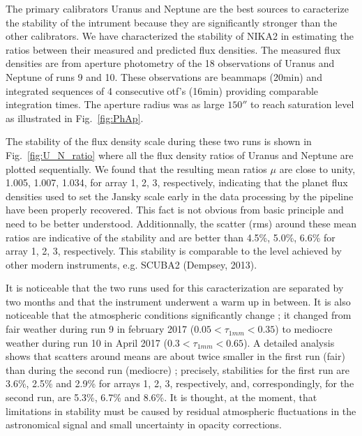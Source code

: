 The primary calibrators Uranus and Neptune are the best sources to caracterize the stability of the intrument
because they are significantly stronger than the other calibrators.
We have characterized the stability of NIKA2  in estimating the ratios between their measured 
and predicted flux densities. The measured flux densities are from aperture photometry of the
18 observations  of Uranus and Neptune of runs 9 and 10. These observations are   beammaps  (20min) and integrated sequences of 4 consecutive otf's 
(16min) providing comparable integration times. The aperture radius was as large $150''$ to reach saturation level
as illustrated in Fig.~\ref{fig:PhAp}. 

The stability of the flux density scale during these two runs 
is shown  in  Fig.~\ref{fig:U_N_ratio}  where all the flux density ratios of Uranus and Neptune are
plotted sequentially.
We found that the resulting mean ratios $\mu$ are close to unity,  1.005, 1.007, 1.034, for array 1, 2, 3, respectively,
indicating that the planet flux densities used to set the Jansky scale 
early in the data processing by the pipeline have been properly recovered. This fact is not obvious from basic principle and need to be better
understood. Additionnally, the scatter (rms) around these mean ratios are indicative of
the stability and are better than 4.5\%, 5.0\%, 6.6\% for array 1, 2, 3,
respectively. This stability is comparable to the level achieved by other modern instruments,
e.g. SCUBA2 (Dempsey, 2013).

It is noticeable that the two runs used for this caracterization  are
separated by two months and that the instrument underwent a warm up in between. It is also noticeable that the
atmospheric conditions significantly change ; it changed from fair weather during run 9 in february 2017
($0.05 < \tau_{1mm} < 0.35$) to mediocre weather during run 10 in April 2017 ($0.3 < \tau_{1mm} < 0.65$). 
A detailed analysis shows that scatters around means 
are about twice smaller in the first run (fair) than during the second run (mediocre) ;
precisely, stabilities for the first run
are 3.6\%, 2.5\% and 2.9\% for arrays 1, 2, 3, respectively,
and, correspondingly, for the second run, are  5.3\%, 6.7\% and 8.6\%.
It is thought, at the moment, that limitations in stability must be  caused by residual atmospheric fluctuations
in the astronomical signal and small uncertainty in opacity corrections.

